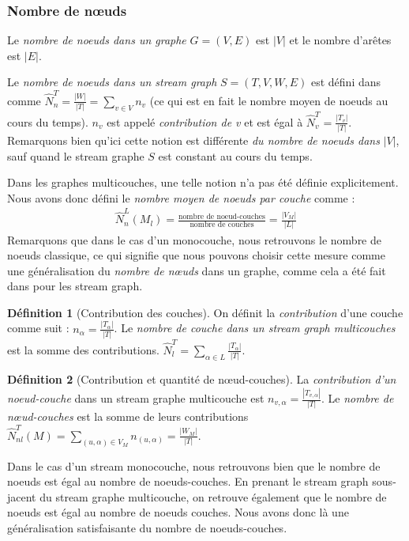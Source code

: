 \documentclass[11pt,a4paper]{article}
\theoremstyle{definition}
\newtheorem{defn}{Définition}
\theoremstyle{remark}
\theoremstyle{remark}
\def \stg {stream graph}
\begin{document}
	\subsubsection{Nombre de nœuds}
	Le {\em nombre de noeuds dans un graphe} $G=(V,E)$ est $|V|$ et le nombre d'arêtes est $|E|$.
	
	Le {\em nombre de noeuds dans un \stg{}} $S=(T,V,W,E)$ est défini dans \cite{stream} comme $\hat{N}^T_n=\frac{|W|}{|T|}=\sum_{v\in V} n_v$ (ce qui est en fait le nombre moyen de noeuds au cours du temps). $n_v$ est appelé {\em contribution de v} et est égal à $\hat{N}^T_v=\frac{|T_v|}{|T|}$. Remarquons bien qu'ici cette notion est différente {\em du nombre de noeuds dans} $|V|$, sauf quand le stream graphe $S$ est constant au cours du temps.
	\newline
	
	Dans les graphes multicouches, une telle notion n'a pas été définie explicitement.
	Nous avons donc défini le {\em nombre moyen de noeuds par couche} comme :
	\begin{align*}
		\hat{N}_n^L(M_l) = \frac{\text{nombre de noeud-couches}}{\text{nombre de couches}}=\frac{|V_M|}{|L|}
	\end{align*}	    
	Remarquons que dans le cas d'un monocouche, nous retrouvons le nombre de noeuds classique, ce qui signifie que nous pouvons choisir cette mesure comme une généralisation du {\em nombre de nœuds} dans un graphe, comme cela a été fait dans \cite{stream} pour les \stg{}.
		
	
	\begin{defn}[Contribution des couches]
	On définit la {\em contribution} d'une couche comme suit : $n_\alpha = \frac{|T_{\alpha}|}{|T|}$. Le {\em nombre de couche dans un stream graph multicouches} est la somme des contributions. $\hat{N}^T_l = \sum_{\alpha \in L}\frac{ |T_{\alpha}|}{|T|}$.
    \end{defn}
	
	\begin{defn}[Contribution et quantité de nœud-couches]
	La {\em contribution d'un noeud-couche} dans un stream graphe multicouche est $n_{v,\alpha} = \frac{|T_{v,\alpha}|}{|T|}$. Le {\em nombre de nœud-couches} est la somme de leurs contributions $\hat{N}^{T}_{nl}(M) = \underset{(u,\alpha)\in V_M}{\sum} n_{(u,\alpha)} = \frac{|W_M|}{|T|}$.
    \end{defn}
	
	Dans le cas d'un stream monocouche, nous retrouvons bien que le nombre de noeuds est égal au nombre de noeuds-couches. En prenant le stream graph sous-jacent du stream graphe multicouche, on retrouve également que le nombre de noeuds est égal au nombre de noeuds couches. Nous avons donc là une généralisation satisfaisante du nombre de noeuds-couches.
    
\end{document}

